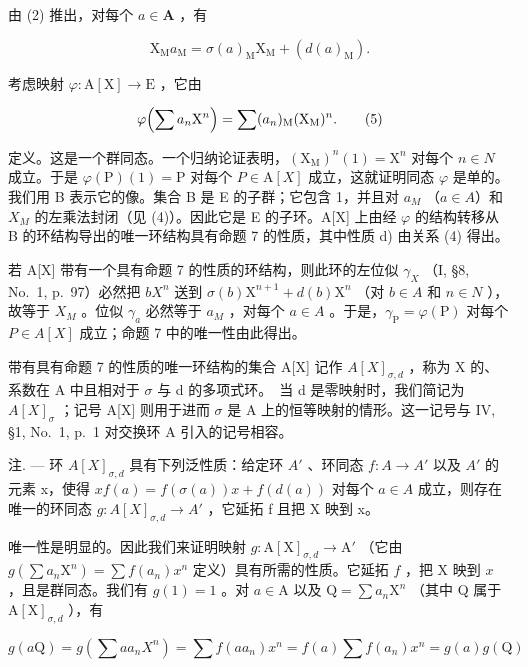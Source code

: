 由 (2) 推出，对每个 \(a \in \mathbf{A}\) ，有

\[
\mathrm{X} _ {\mathrm{M}} a _ {\mathrm{M}} = \sigma (a) _ {\mathrm{M}} \mathrm{X} _ {\mathrm{M}} + (d (a) _ {\mathrm{M}}).\tag{4}
\]

考虑映射 \(\varphi : \mathrm{A}[\mathrm{X}] \to \mathrm{E}\) ，它由

\[
\varphi \Bigl (\sum a _ {n} \mathrm{X} ^ {n} \Bigr) = \sum (a _ {n}) _ {\mathrm{M}} (\mathrm{X} _ {\mathrm{M}}) ^ {n}.\tag{5}
\]

定义。这是一个群同态。一个归纳论证表明，\((\mathrm{X}_{\mathrm{M}})^{n}(1)=\mathrm{X}^{n}\) 对每个 \(n\in N\) 成立。于是 \(\varphi(\mathrm{P})(1)=\mathrm{P}\) 对每个 \(P\in\mathrm{A}[X]\) 成立，这就证明同态 \(\varphi\) 是单的。我们用 B 表示它的像。集合 B 是 E 的子群；它包含 1，并且对 \(a_{M}\) （\(a\in A\)）和 \(X_{M}\) 的左乘法封闭（见 (4)）。因此它是 E 的子环。A{[}X{]} 上由经 \(\varphi\) 的结构转移从 B 的环结构导出的唯一环结构具有命题 7 的性质，其中性质 d) 由关系 (4) 得出。

若 A{[}X{]} 带有一个具有命题 7 的性质的环结构，则此环的左位似 \(\gamma_{X}\) （I, §8, No.~1, p.~97）必然把 \(bX^{n}\) 送到 \(\sigma(b)\mathrm{X}^{n+1} + d(b)\mathrm{X}^{n}\) （对 \(b \in A\) 和 \(n \in N\) ），故等于 \(X_{M}\) 。位似 \(\gamma_{a}\) 必然等于 \(a_{M}\) ，对每个 \(a \in A\) 。于是，\(\gamma_{\mathrm{P}} = \varphi(\mathrm{P})\) 对每个 \(P \in A[X]\) 成立；命题 7 中的唯一性由此得出。

带有具有命题 7 的性质的唯一环结构的集合 A{[}X{]} 记作 \(A[X]_{\sigma,d}\) ，称为 X 的、系数在 A 中且相对于 \(\sigma\) 与 d 的多项式环。~当 d 是零映射时，我们简记为 \(A[X]_{\sigma}\) ；记号 A{[}X{]} 则用于进而 \(\sigma\) 是 A 上的恒等映射的情形。这一记号与 IV, §1, No.~1, p.~1 对交换环 A 引入的记号相容。

注. --- 环 \(A[X]_{\sigma,d}\) 具有下列泛性质：给定环 \(A'\) 、环同态 \(f: A \to A'\) 以及 \(A'\) 的元素 x，使得 \(xf(a) = f(\sigma(a))x + f(d(a))\) 对每个 \(a \in A\) 成立，则存在唯一的环同态 \(g: A[X]_{\sigma,d} \to A'\) ，它延拓 f 且把 X 映到 x。

唯一性是明显的。因此我们来证明映射 \(g: \mathrm{A}[\mathrm{X}]_{\sigma,d} \to \mathrm{A}'\) （它由 \(g(\sum a_n\mathrm{X}^n) = \sum f(a_n)x^n\) 定义）具有所需的性质。它延拓 \(f\) ，把 \(\mathrm{X}\) 映到 \(x\) ，且是群同态。我们有 \(g(1) = 1\) 。对 \(a \in \mathrm{A}\) 以及 \(\mathrm{Q} = \sum a_n\mathrm{X}^n\) （其中 Q 属于 \(\mathrm{A}[\mathrm{X}]_{\sigma,d}\) ），有

\[
g (a \mathrm{Q}) = g \left(\sum a a _ {n} X ^ {n}\right) = \sum f (a a _ {n}) x ^ {n} = f (a) \sum f (a _ {n}) x ^ {n} = g (a) g (\mathrm{Q})
\]

